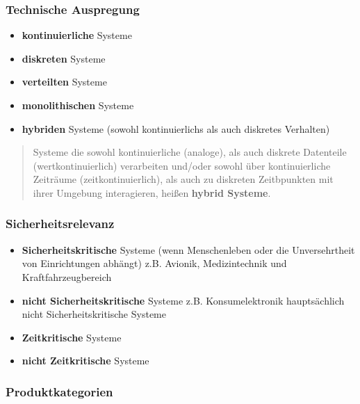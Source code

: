 \documentclass[
]{article}
\providecommand{\tightlist}{%
  \setlength{\itemsep}{0pt}\setlength{\parskip}{0pt}}
\begin{document}
\hypertarget{technische-auspregung}{%
\subsubsection{Technische Auspregung}\label{technische-auspregung}}

\begin{itemize}
\tightlist
\item
  \textbf{kontinuierliche} Systeme
\item
  \textbf{diskreten} Systeme
\item
  \textbf{verteilten} Systeme
\item
  \textbf{monolithischen} Systeme
\item
  \textbf{hybriden} Systeme (sowohl kontinuierlichs als auch diskretes
  Verhalten)
\end{itemize}

\begin{quote}
Systeme die sowohl kontinuierliche (analoge), als auch diskrete
Datenteile (wertkontinuierlich) verarbeiten und/oder sowohl über
kontinuierliche Zeiträume (zeitkontinuierlich), als auch zu diskreten
Zeitbpunkten mit ihrer Umgebung interagieren, heißen \textbf{hybrid
Systeme}.
\end{quote}

\hypertarget{sicherheitsrelevanz}{%
\subsubsection{Sicherheitsrelevanz}\label{sicherheitsrelevanz}}

\begin{itemize}
\tightlist
\item
  \textbf{Sicherheitskritische} Systeme (wenn Menschenleben oder die
  Unversehrtheit von Einrichtungen abhängt) z.B. Avionik, Medizintechnik
  und Kraftfahrzeugbereich
\item
  \textbf{nicht Sicherheitskritische} Systeme z.B. Konsumelektronik
  hauptsächlich nicht Sicherheitskritische Systeme
\item
  \textbf{Zeitkritische} Systeme
\item
  \textbf{nicht Zeitkritische} Systeme
\end{itemize}

\hypertarget{produktkategorien}{%
\subsubsection{Produktkategorien}\label{produktkategorien}}
\end{document}
